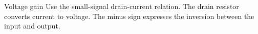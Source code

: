 \begin{notederivation}[mode=steps]{Voltage gain}
    {Use the small-signal drain-current relation.}
    {The drain resistor converts current to voltage. The minus
     sign expresses the inversion between the input and output.}
\end{notederivation}
